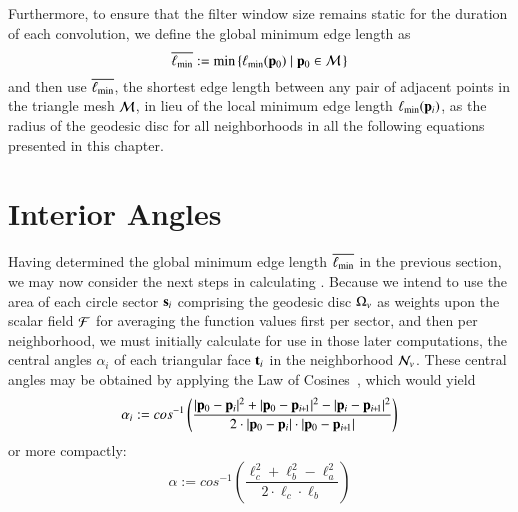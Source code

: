 Furthermore, to ensure that the filter window size remains static for the duration of each convolution, we define the global minimum edge length as
%
\begin{equation}
	\overline{\ell_\text{min}} := \min\left \{\ell_\text{min}(\mathbf{p}_0) \;|\; \mathbf{p}_0 \in \mathcal{M}\,\right \}
	\label{eq:globalMinimumEdgeLength}
\end{equation}%
%
%
and then use $\overline{\ell_\text{min}}$, the shortest edge length between any pair of adjacent points in the triangle mesh $\mathcal{M}$, in lieu of the local minimum edge length $\ell_\text{min}(\mathbf{p}_i)$, as the radius of the geodesic disc for all neighborhoods in all the following equations presented in this chapter.

%
%
%
\section{Interior Angles}
\label{ch4sIA}
Having determined the global minimum edge length $\overline{\ell_\text{min}}$ in the previous section, we may now consider the next steps in calculating . Because we intend to use the area of each circle sector $\mathbf{s}_i$ comprising the geodesic disc $\Omega_v$ as weights upon the scalar field $\mathcal{F}$ for averaging the function values first per sector, and then per neighborhood, we must initially calculate for use in those later computations, the central angles $\alpha_i$ of each triangular face $\mathbf{t}_i$ in the neighborhood $\mathcal{N}_v$. These central angles may be obtained by applying the Law of Cosines~\cite{Weisstein19e}, which would yield
%
\begin{equation}
	\alpha_i := cos^{-1}\left (\frac{|\bp_0 - \bp_{i}|^2 + |\bp_0 - \bp_{\sipo}|^2 - |\bp_i - \bp_{\sipo}|^2}{2\cdot|\bp_0 - \bp_{i}|\cdot|\bp_0 - \bp_{\sipo}|}\right )
\end{equation}
%
or more compactly:
%
\begin{equation}
	\alpha := cos^{-1}\left (\frac{\ell_c^2 + \ell_b^2 - \ell_a^2}{2\cdot\ell_c\cdot\ell_b}\right )
	\label{eq:alphaFromEdgeLengths}
\end{equation}%
%

